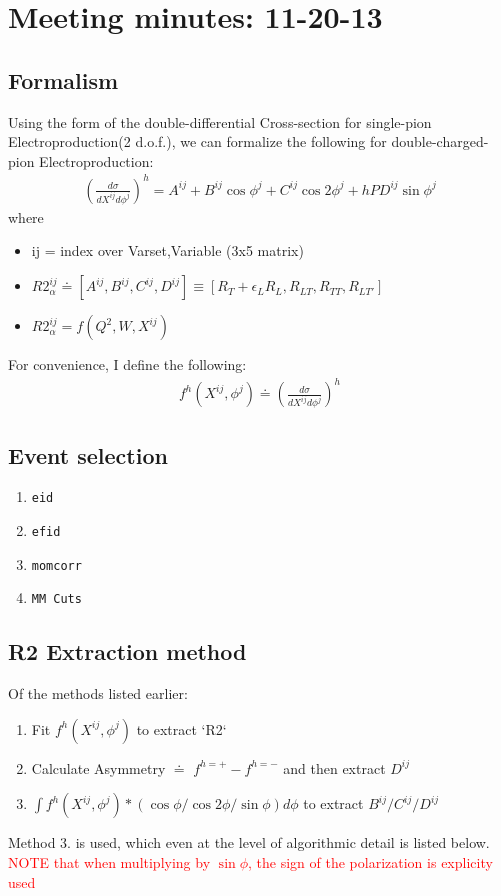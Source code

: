 \documentclass{article}
\newcommand{\code}[1]{\texttt{#1}}
\numberwithin{equation}{subsection}
\begin{document}
\tableofcontents

\section{Meeting minutes: 11-20-13}
\subsection{Formalism}
Using the form of the double-differential Cross-section for single-pion Electroproduction(2 d.o.f.), we can formalize the following for double-charged-pion Electroproduction:
\begin{eqnarray}
\left(\frac{d\sigma}{dX^{ij}d\phi^{j}}\right)^{h} = 
A^{ij} +  B^{ij}\cos\phi^{j} + C^{ij}\cos2\phi^{j} + hPD^{ij}\sin\phi^{j}
\end{eqnarray}
where
\begin{itemize}
	\item ij = index over Varset,Variable (3x5 matrix)
	\item $R2^{ij}_{\alpha} \doteq 
	[A^{ij},B^{ij},C^{ij},D^{ij}] \equiv 
	[R_{T}+\epsilon_{L}R_{L}, R_{LT}, R_{TT}, R_{LT'}]$
	\item $R2^{ij}_{\alpha} = f(Q^{2},W,X^{ij})$
\end{itemize}

For convenience, I define the following:
\begin{eqnarray}
f^{h}(X^{ij},\phi^{j}) \doteq \left(\frac{d\sigma}{dX^{ij}d\phi^{j}}\right)^{h}
\end{eqnarray}


\subsection{Event selection}
\begin{enumerate}
	\item \code{eid}
	\item \code{efid}
	\item \code{momcorr}
	\item \code{MM Cuts}
\end{enumerate}

\subsection{R2 Extraction method}
Of the methods listed earlier:
\begin{enumerate}
	\item Fit $f^{h}(X^{ij},\phi^{j})$ to extract `R2`
	\item Calculate Asymmetry $\doteq$ $f^{h=+}-f^{h=-}$ and then extract $D^{ij}$
	\item $\int f^{h}(X^{ij},\phi^{j}) * (\cos\phi/\cos 2\phi/\sin\phi)d\phi$ to extract $B^{ij}/C^{ij}/D^{ij}$
\end{enumerate}
Method 3. is used, which even at the level of algorithmic detail is listed below. \textcolor{red}{NOTE that when multiplying by $\sin\phi$, the sign of the polarization is explicity used}
\end{document}
